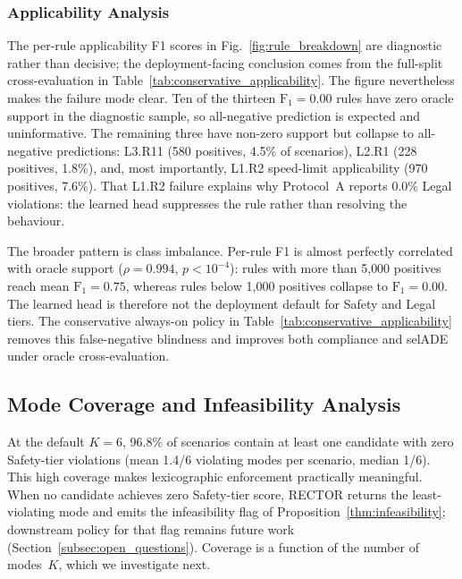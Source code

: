 \subsubsection{Applicability Analysis}
\label{subsec:applicability_analysis}

The per-rule applicability F1 scores in Fig.~\ref{fig:rule_breakdown} are diagnostic rather than decisive; the deployment-facing conclusion comes from the full-split cross-evaluation in Table~\ref{tab:conservative_applicability}.  The figure nevertheless makes the failure mode clear.  Ten of the thirteen $\text{F}_1{=}0.00$ rules have zero oracle support in the diagnostic sample, so all-negative prediction is expected and uninformative.  The remaining three have non-zero support but collapse to all-negative predictions: L3.R11 (580 positives, 4.5\% of scenarios), L2.R1 (228 positives, 1.8\%), and, most importantly, L1.R2 speed-limit applicability (970 positives, 7.6\%).  That L1.R2 failure explains why Protocol~A reports 0.0\% Legal violations: the learned head suppresses the rule rather than resolving the behaviour.

The broader pattern is class imbalance.  Per-rule F1 is almost perfectly correlated with oracle support ($\rho{=}0.994$, $p < 10^{-4}$): rules with more than 5{,}000 positives reach mean $\text{F}_1{=}0.75$, whereas rules below 1{,}000 positives collapse to $\text{F}_1{=}0.00$.  The learned head is therefore not the deployment default for Safety and Legal tiers.  The conservative always-on policy in Table~\ref{tab:conservative_applicability} removes this false-negative blindness and improves both compliance and selADE under oracle cross-evaluation.

\subsection{Mode Coverage and Infeasibility Analysis}
\label{subsec:mode_coverage}

At the default $K{=}6$, 96.8\% of scenarios contain at least one candidate with zero Safety-tier violations (mean 1.4/6 violating modes per scenario, median 1/6). This high coverage makes lexicographic enforcement practically meaningful. When no candidate achieves zero Safety-tier score, RECTOR returns the least-violating mode and emits the infeasibility flag of Proposition~\ref{thm:infeasibility}; downstream policy for that flag remains future work (Section~\ref{subsec:open_questions}). Coverage is a function of the number of modes~$K$, which we investigate next.

